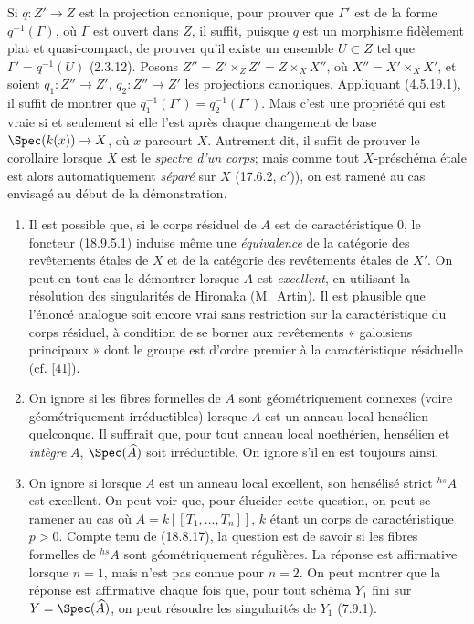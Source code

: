Si $q:Z'\to Z$ est la projection canonique, pour prouver que $\Gamma'$ est de la forme $q^{-1}(\Gamma)$, où $\Gamma$ est ouvert dans $Z$, il suffit, puisque $q$ est un morphisme fidèlement plat et quasi-compact, de prouver qu'il existe un ensemble $U\subset Z$ tel que $\Gamma'=q^{-1}(U)$ (2.3.12). Posons $Z''=Z'\times_Z Z'=Z\times_X X''$, où $X''=X'\times_X X'$, et soient $q_1:Z''\to Z'$, $q_2:Z''\to Z'$ les projections canoniques. Appliquant (4.5.19.1), il suffit de montrer que $q_1^{-1}(\Gamma')=q_2^{-1}(\Gamma')$. Mais c'est une propriété qui est vraie si et seulement si elle l'est après chaque changement de base $\Spec(k(x))\to X$, où $x$ parcourt $X$. Autrement dit, il suffit de prouver le corollaire lorsque $X$ est le \emph{spectre d'un corps}; mais comme tout $X$-préschéma étale est alors automatiquement \emph{séparé} sur $X$ (17.6.2, $c'$)), on est ramené au cas envisagé au début de la démonstration.

\begin{remarks}[18.9.6]
\label{IV.18.9.6}
\begin{enumerate}
  \item[(i)] Il est possible que, si le corps résiduel de $A$ est de caractéristique 0, le foncteur (18.9.5.1) induise même une \emph{équivalence} de la catégorie des revêtements étales de $X$ et de la catégorie des revêtements étales de $X'$. On peut en tout cas le démontrer lorsque $A$ est \emph{excellent}, en utilisant la résolution des singularités de Hironaka (M.~Artin). Il est plausible que l'énoncé analogue soit encore vrai sans restriction sur la caractéristique du corps résiduel, à condition de se borner aux revêtements « galoisiens principaux » dont le groupe est d'ordre premier à la caractéristique résiduelle (cf. [41]).


  \item[(ii)] On ignore si les fibres formelles de $A$ sont géométriquement connexes (voire géométriquement irréductibles) lorsque $A$ est un anneau local hensélien quelconque. Il suffirait que, pour tout anneau local noethérien, hensélien et \emph{intègre} $A$, $\Spec(\widehat A)$ soit irréductible. On ignore s'il en est toujours ainsi.

  \item[(iii)] On ignore si lorsque $A$ est un anneau local excellent, son hensélisé strict ${}^{hs}\!A$ est excellent. On peut voir que, pour élucider cette question, on peut se ramener au cas où $A=k[[T_1,\ldots,T_n]]$, $k$ étant un corps de caractéristique $p>0$. Compte tenu de (18.8.17), la question est de savoir si les fibres formelles de ${}^{hs}\!A$ sont géométriquement régulières. La réponse est affirmative lorsque $n=1$, mais n'est pas connue pour $n=2$. On peut montrer que la réponse est affirmative chaque fois que, pour tout schéma $Y_1$ fini sur $Y=\Spec(\widehat A)$, on peut résoudre les singularités de $Y_1$ (7.9.1).
\end{enumerate}
\end{remarks}

